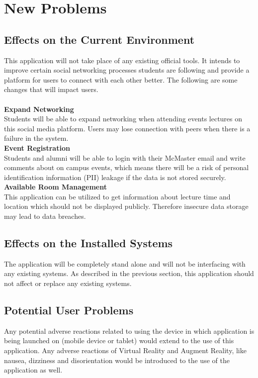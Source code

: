 \documentclass[12pt]{article}
\begin{document}
\section{New Problems}
\subsection{Effects on the Current Environment}

This application will not take place of any existing official tools. It intends to improve certain social networking processes students are following and provide a platform for users to connect with each other better. The following are some changes that will impact users.\\
\noindent\\
\textbf{Expand Networking}\\
Students will be able to expand networking when attending events lectures on this social media platform. Users may lose connection with peers when there is a failure in the system. 
\noindent\\
\textbf{Event Registration}\\
Students and alumni will be able to login with their McMaster email and write comments about on campus events, which means there will be a risk of personal identification information (PII) leakage if the data is not stored securely.
\noindent\\
\textbf{Available Room Management}\\
This application can be utilized to get information about lecture time and location which should not be displayed publicly. Therefore insecure data storage may lead to data breaches.

\subsection{Effects on the Installed Systems}

The application will be completely stand alone and will not be interfacing with any existing systems.  As described in the previous section, this application should not affect or replace any existing systems.

\subsection{Potential User Problems}

Any potential adverse reactions related to using the device in which application is being launched on (mobile device or tablet) would extend to the use of this application.  Any adverse reactions of Virtual Reality and Augment Reality, like nausea, dizziness and disorientation would be introduced to the use of the application as well.
\end{document}
